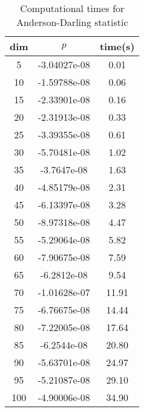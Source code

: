 \begin{table}[htbp]
\begin{center}
\begin{tabular}{ccc}
dim& $p$ & time(s)\\
\hline
5 & -3.04027e-08 & 0.01 \\ 
10 & -1.59788e-08 & 0.06 \\ 
15 & -2.33901e-08 & 0.16 \\ 
20 & -2.31913e-08 & 0.33 \\ 
25 & -3.39355e-08 & 0.61 \\ 
30 & -5.70481e-08 & 1.02 \\ 
35 & -3.7647e-08 & 1.63 \\ 
40 & -4.85179e-08 & 2.31 \\ 
45 & -6.13397e-08 & 3.28 \\ 
50 & -8.97318e-08 & 4.47 \\ 
55 & -5.29064e-08 & 5.82 \\ 
60 & -7.90675e-08 & 7.59 \\ 
65 & -6.2812e-08 & 9.54 \\ 
70 & -1.01628e-07 & 11.91 \\ 
75 & -6.76675e-08 & 14.44 \\ 
80 & -7.22005e-08 & 17.64 \\ 
85 & -6.2544e-08 & 20.80 \\ 
90 & -5.63701e-08 & 24.97 \\ 
95 & -5.21087e-08 & 29.10 \\ 
100 & -4.90006e-08 & 34.90 \\ 
\hline
\end{tabular}
\end{center}
\caption{Computational times for Anderson-Darling statistic}
\label{tab:AD}
\end{table}

